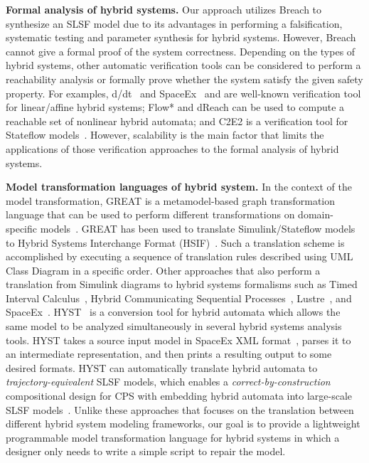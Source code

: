 \vspace{0.5em}
\noindent
{\bf Formal analysis of hybrid systems.} Our approach utilizes Breach to synthesize an SLSF model due to its advantages in performing a falsification, systematic testing and parameter synthesis for hybrid systems. However, Breach cannot give a formal proof of the system correctness. Depending on the types of hybrid systems, other automatic verification tools can be considered to perform a reachability analysis or formally prove whether the system satisfy the given safety property. For examples, d/dt~\cite{asarin2002d} and SpaceEx~\cite{frehse2011cav} and  are well-known verification tool for linear/affine hybrid systems; Flow*\cite{chen2013flow} and dReach\cite{kong2015dreach} can be used to compute a reachable set of nonlinear hybrid automata; and C2E2 is a verification tool for Stateflow models~\cite{duggirala2015c2e2}. 
%
However, scalability is the main factor that limits the applications of those verification approaches to the formal analysis of hybrid systems. 

  
\vspace{0.5em}
\noindent
{\bf Model transformation languages of hybrid system.} In the context of the model transformation, GREAT is a metamodel-based graph transformation language that can be used to perform different transformations on domain-specific models~\cite{agrawal2003graph, agrawal2003end}. GREAT has been used to translate Simulink/Stateflow models to Hybrid Systems Interchange Format (HSIF)~\cite{agrawal2004semantic}. Such a translation scheme is accomplished by executing a sequence of translation rules described using UML Class Diagram in a specific order. %
% 
Other approaches that also perform a translation from Simulink diagrams to hybrid systems formalisms such as Timed Interval Calculus~\cite{chen2009formal}, Hybrid Communicating Sequential Processes~\cite{liu2010calculus}, Lustre~\cite{tripakis2005translating}, and SpaceEx~\cite{minopoli2016sl2sx}.  
%
HYST~\cite{bak2015hyst} is a conversion tool for hybrid automata which allows the same model to be analyzed simultaneously in several hybrid systems analysis tools. HYST takes a source input model in SpaceEx XML format~\cite{frehse2011spaceex}, parses it to an intermediate representation, and then prints a resulting output to some desired formats. HYST can automatically translate hybrid automata to \emph{trajectory-equivalent} SLSF models, which enables a \emph{correct-by-construction} compositional design for CPS with embedding hybrid automata into large-scale SLSF models~\cite{bak2017hybrid}.  
%
Unlike these approaches that focuses on the translation between different hybrid system modeling frameworks, our goal is to provide a lightweight programmable model transformation language for hybrid systems in which a designer only needs to write a simple script to repair the model.  
 
